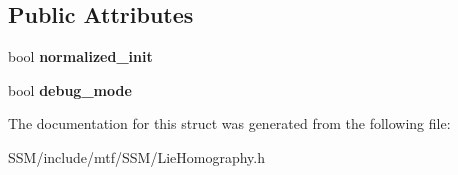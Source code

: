 \subsection*{Public Attributes}
\begin{DoxyCompactItemize}
\item 
\hypertarget{structLieHomographyParams_ad7b454a6f6e78e90f642fd13dfe90d9a}{bool {\bfseries normalized\-\_\-init}}\label{structLieHomographyParams_ad7b454a6f6e78e90f642fd13dfe90d9a}

\item 
\hypertarget{structLieHomographyParams_a8b01c5946407bf9c6515435946ea5534}{bool {\bfseries debug\-\_\-mode}}\label{structLieHomographyParams_a8b01c5946407bf9c6515435946ea5534}

\end{DoxyCompactItemize}


The documentation for this struct was generated from the following file\-:\begin{DoxyCompactItemize}
\item 
S\-S\-M/include/mtf/\-S\-S\-M/Lie\-Homography.\-h\end{DoxyCompactItemize}
